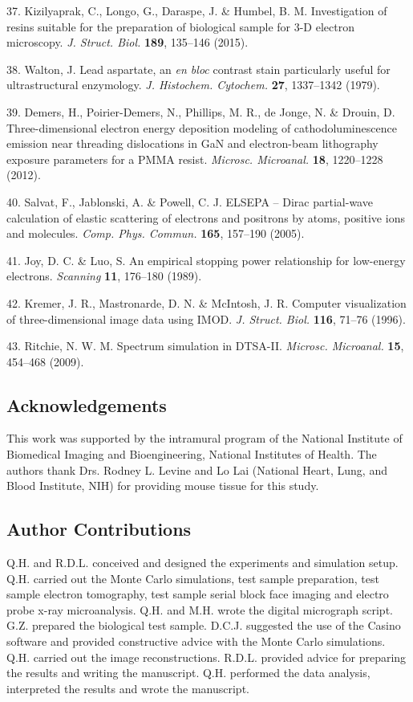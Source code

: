 \documentclass{article}
\newenvironment{reflist}{\par\small\setlength{\parindent}{0pt}\everypar{\hangindent=2.2em\hangafter=1}}{\par}
\begin{document}
\begin{reflist}
37. Kizilyaprak, C., Longo, G., Daraspe, J. \& Humbel, B. M. Investigation of resins suitable for the preparation of biological sample for 3-D electron microscopy. \emph{J. Struct. Biol.} \textbf{189}, 135–146 (2015).

38. Walton, J. Lead aspartate, an \emph{en bloc} contrast stain particularly useful for ultrastructural enzymology. \emph{J. Histochem. Cytochem.} \textbf{27}, 1337–1342 (1979).

39. Demers, H., Poirier-Demers, N., Phillips, M. R., de Jonge, N. \& Drouin, D. Three-dimensional electron energy deposition modeling of cathodoluminescence emission near threading dislocations in GaN and electron-beam lithography exposure parameters for a PMMA resist. \emph{Microsc. Microanal.} \textbf{18}, 1220–1228 (2012).

40. Salvat, F., Jablonski, A. \& Powell, C. J. ELSEPA – Dirac partial-wave calculation of elastic scattering of electrons and positrons by atoms, positive ions and molecules. \emph{Comp. Phys. Commun.} \textbf{165}, 157–190 (2005).

41. Joy, D. C. \& Luo, S. An empirical stopping power relationship for low-energy electrons. \emph{Scanning} \textbf{11}, 176–180 (1989).

42. Kremer, J. R., Mastronarde, D. N. \& McIntosh, J. R. Computer visualization of three-dimensional image data using IMOD. \emph{J. Struct. Biol.} \textbf{116}, 71–76 (1996).

43. Ritchie, N. W. M. Spectrum simulation in DTSA-II. \emph{Microsc. Microanal.} \textbf{15}, 454–468 (2009).
\end{reflist}

\subsection*{Acknowledgements}
This work was supported by the intramural program of the National Institute of Biomedical Imaging and Bioengineering, National Institutes of Health. The authors thank Drs. Rodney L. Levine and Lo Lai (National Heart, Lung, and Blood Institute, NIH) for providing mouse tissue for this study.

\subsection*{Author Contributions}
Q.H. and R.D.L. conceived and designed the experiments and simulation setup. Q.H. carried out the Monte Carlo simulations, test sample preparation, test sample electron tomography, test sample serial block face imaging and electro probe x-ray microanalysis. Q.H. and M.H. wrote the digital micrograph script. G.Z. prepared the biological test sample. D.C.J. suggested the use of the Casino software and provided constructive advice with the Monte Carlo simulations. Q.H. carried out the image reconstructions. R.D.L. provided advice for preparing the results and writing the manuscript. Q.H. performed the data analysis, interpreted the results and wrote the manuscript.
\end{document}
